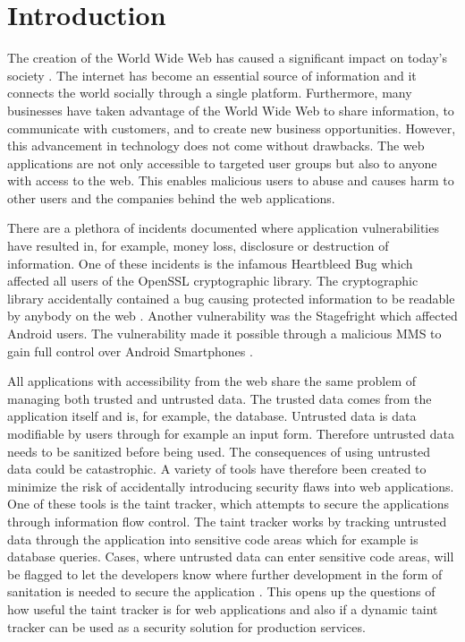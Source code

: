 \chapter{Introduction}
\label{Introduction}
The creation of the World Wide Web has caused a significant impact on today's society \parencite{www}. The internet has become an essential source of information and it connects the world socially through a single platform. Furthermore, many businesses have taken advantage of the World Wide Web to share information, to communicate with customers, and to create new business opportunities. However, this advancement in technology does not come without drawbacks. The web applications are not only accessible to targeted user groups but also to anyone with access to the web. This enables malicious users to abuse and causes harm to other users and the companies behind the web applications.

There are a plethora of incidents documented where application vulnerabilities have resulted in, for example, money loss, disclosure or destruction of information. One of these incidents is the infamous Heartbleed Bug which affected all users of the OpenSSL cryptographic library. The cryptographic library accidentally contained a bug causing protected information to be readable by anybody on the web \parencite{Heartbleed}. Another vulnerability was the Stagefright which affected Android users. The vulnerability made it possible through a malicious MMS to gain full control over Android Smartphones \parencite{2015ASvt}. 

All applications with accessibility from the web share the same problem of managing both trusted and untrusted data. The trusted data comes from the application itself and is, for example, the database. Untrusted data is data modifiable by users through for example an input form. Therefore untrusted data needs to be sanitized before being used. The consequences of using untrusted data could be catastrophic. A variety of tools have therefore been created to minimize the risk of accidentally introducing security flaws into web applications. One of these tools is the taint tracker, which attempts to secure the applications through information flow control. The taint tracker works by tracking untrusted data through the application into sensitive code areas which for example is database queries. Cases, where untrusted data can enter sensitive code areas, will be flagged to let the developers know where further development in the form of sanitation is needed to secure the application \parencite{Pan2015, Venkataramani2008}. This opens up the questions of how useful the taint tracker is for web applications and also if a dynamic taint tracker can be used as a security solution for production services.



